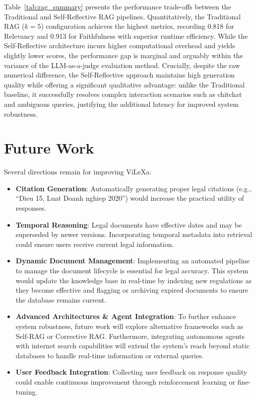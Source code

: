 \documentclass[letterpaper]{article} %
\begin{document}
Table~\ref{tab:rag_summary} presents the performance trade-offs between the Traditional and Self-Reflective RAG pipelines. Quantitatively, the Traditional RAG ($k=5$) configuration achieves the highest metrics, recording 0.818 for Relevancy and 0.913 for Faithfulness with superior runtime efficiency. While the Self-Reflective architecture incurs higher computational overhead and yields slightly lower scores, the performance gap is marginal and arguably within the variance of the LLM-as-a-judge evaluation method. Crucially, despite the raw numerical difference, the Self-Reflective approach maintains high generation quality while offering a significant qualitative advantage: unlike the Traditional baseline, it successfully resolves complex interaction scenarios such as chitchat and ambiguous queries, justifying the additional latency for improved system robustness.

\section{Future Work}

Several directions remain for improving ViLeXa:

\begin{itemize}
    \item \textbf{Citation Generation}: Automatically generating proper legal citations (e.g., ``Dieu 15, Luat Doanh nghiep 2020'') would increase the practical utility of responses.

    \item \textbf{Temporal Reasoning}: Legal documents have effective dates and may be superseded by newer versions. Incorporating temporal metadata into retrieval could ensure users receive current legal information.

    \item \textbf{Dynamic Document Management}: Implementing an automated pipeline to manage the document lifecycle is essential for legal accuracy. This system would update the knowledge base in real-time by indexing new regulations as they become effective and flagging or archiving expired documents to ensure the database remains current.

    \item \textbf{Advanced Architectures \& Agent Integration}: To further enhance system robustness, future work will explore alternative frameworks such as Self-RAG or Corrective RAG. Furthermore, integrating autonomous agents with internet search capabilities will extend the system's reach beyond static databases to handle real-time information or external queries.

    \item \textbf{User Feedback Integration}: Collecting user feedback on response quality could enable continuous improvement through reinforcement learning or fine-tuning.
\end{itemize}
\end{document}
